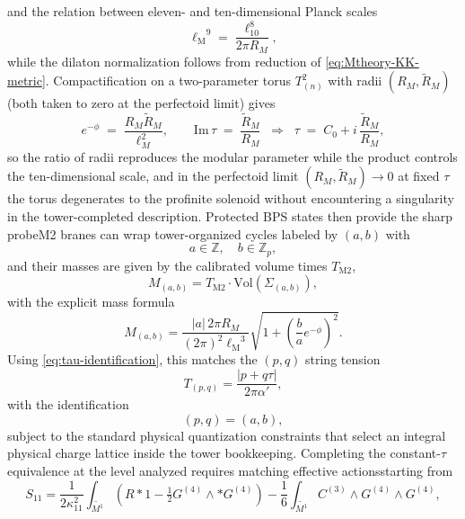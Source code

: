 \documentclass[11pt]{article}
\theoremstyle{remark}
\newcommand{\Z}{\mathbb{Z}}
\newcommand{\tM}{\widetilde{M^{1}}}
\newcommand{\Mpl}{\ensuremath{\ell_{\mathrm{M}}}}
\begin{document}
and the relation between eleven- and ten-dimensional Planck scales
\begin{equation}
\Mpl^{9} = \frac{\ell_{10}^{8}}{2\pi R_{M}},
\end{equation}
while the dilaton normalization follows from reduction of \eqref{eq:Mtheory-KK-metric}. Compactification on a two-parameter torus \(T^{2}_{(n)}\) with radii \((R_M,\widetilde R_M)\) (both taken to zero at the perfectoid limit) gives
\begin{equation}
e^{-\phi}\;=\;\frac{R_{M}\widetilde R_{M}}{\ell^{2}_{M}},
\qquad
\mathrm{Im}\,\tau \;=\;\frac{\widetilde R_{M}}{R_{M}}
\;\;\Longrightarrow\;\;
\tau \;=\; C_{0}+i\,\frac{\widetilde R_{M}}{R_{M}},
\end{equation}
so the ratio of radii reproduces the modular parameter while the product controls the ten-dimensional scale, and in the perfectoid limit \((R_M,\widetilde R_M)\to 0\) at fixed \(\tau\) the torus degenerates to the profinite solenoid without encountering a singularity in the tower-completed description. Protected BPS states then provide the sharp probe\:M2 branes can wrap tower-organized cycles labeled by \((a,b)\) with
\begin{equation}
a \in \Z, \quad b \in \Z_{p},
\end{equation}
and their masses are given by the calibrated volume times \(T_{\mathrm{M2}}\),
\begin{equation}
M_{(a,b)} = T_{\mathrm{M2}} \cdot \mathrm{Vol}(\Sigma_{(a,b)}),
\end{equation}
with the explicit mass formula
\begin{equation}
\label{eq:BPS-mass}
M_{(a,b)} = \frac{|a| \, 2\pi R_{M}}{(2\pi)^{2} \Mpl^{3}} \sqrt{1 + \left( \frac{b}{a} e^{-\phi} \right)^{2} }.
\end{equation}
Using \eqref{eq:tau-identification}, this matches the \((p,q)\) string tension
\begin{equation}
T_{(p,q)} = \frac{|p + q \tau|}{2 \pi \alpha'},
\end{equation}
with the identification
\begin{equation}
(p,q) = (a,b),
\end{equation}
subject to the standard physical quantization constraints that select an integral physical charge lattice inside the tower bookkeeping. Completing the constant-\(\tau\) equivalence at the level analyzed requires matching effective actions\:starting from
\begin{equation}
S_{11} = \frac{1}{2 \kappa_{11}^{2}} \int_{\tM} \left( R * 1 - \tfrac{1}{2} G^{(4)} \wedge * G^{(4)} \right) - \frac{1}{6} \int_{\tM} C^{(3)} \wedge G^{(4)} \wedge G^{(4)},
\end{equation}
\end{document}

